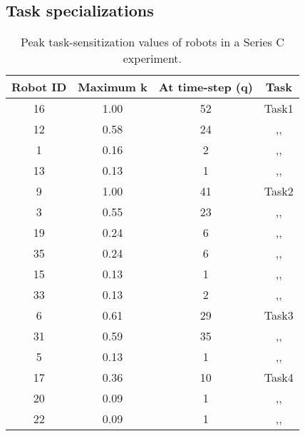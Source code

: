 \subsection*{Task specializations}
\begin{table}
\centering
\caption{Peak task-sensitization values of robots in a Series C experiment.}
\begin{tabular}{|c|c|c|c|}
\hline\textbf{ Robot ID} & \textbf{Maximum k} & \textbf{At time-step (q)} & \textbf{Task} \\
\hline 16 & 1.00 & 52 & Task1\\
\hline 12 & 0.58 & 24 & ,,\\  
\hline 1 & 0.16 & 2 & ,,\\ 
\hline 13 & 0.13 & 1 & ,,\\
\hline 9 & 1.00 & 41 & Task2\\
\hline 3 & 0.55 & 23 & ,,\\ 
\hline 19 & 0.24 & 6 & ,,\\
\hline 35 & 0.24 & 6 & ,,\\
\hline 15 & 0.13 & 1 & ,,\\
\hline 33 & 0.13 & 2 & ,,\\ 
\hline 6 & 0.61 & 29 & Task3\\
\hline 31 & 0.59 & 35 & ,,\\ 
\hline 5 & 0.13 & 1 & ,,\\ 
\hline 17 & 0.36 & 10 & Task4\\
\hline 20 & 0.09 & 1 & ,,\\ 
\hline 22 & 0.09 & 1 & ,,\\ 
 \hline 
\end{tabular} 
\label{table:K-Q-SC}
\end{table}
